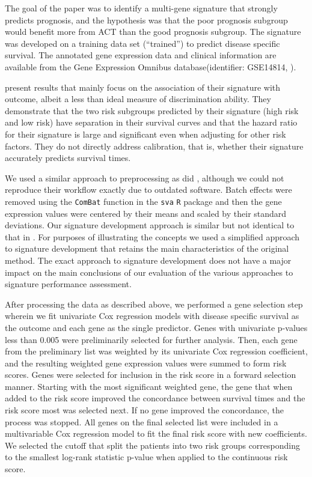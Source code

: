 \documentclass[11pt,]{article}
\begin{document}
The goal of the \citet{zhu2010prognostic} paper was to identify a
multi-gene signature that strongly predicts prognosis, and the
hypothesis was that the poor prognosis subgroup would benefit more from
ACT than the good prognosis subgroup. The signature was developed on a
training data set (``trained'') to predict disease specific survival.
The annotated gene expression data and clinical information are
available from the Gene Expression Omnibus database(identifier:
GSE14814, \citet{edgar2002gene}).

\citet{zhu2010prognostic} present results that mainly focus on the
association of their signature with outcome, albeit a less than ideal
measure of discrimination ability. They demonstrate that the two risk
subgroups predicted by their signature (high risk and low risk) have
separation in their survival curves and that the hazard ratio for their
signature is large and significant even when adjusting for other risk
factors. They do not directly address calibration, that is, whether
their signature accurately predicts survival times.

We used a similar approach to preprocessing as did
\citet{zhu2010prognostic}, although we could not reproduce their
workflow exactly due to outdated software. Batch effects were removed
using the \texttt{ComBat} function in the \texttt{sva} \texttt{R}
package \citep{leeksva} and then the gene expression values were
centered by their means and scaled by their standard deviations. Our
signature development approach is similar but not identical to that in
\citet{zhu2010prognostic}. For purposes of illustrating the concepts we
used a simplified approach to signature development that retains the
main characteristics of the original method. The exact approach to
signature development does not have a major impact on the main
conclusions of our evaluation of the various approaches to signature
performance assessment.

After processing the data as described above, we performed a gene
selection step wherein we fit univariate Cox regression models with
disease specific survival as the outcome and each gene as the single
predictor. Genes with univariate p-values less than 0.005 were
preliminarily selected for further analysis. Then, each gene from the
preliminary list was weighted by its univariate Cox regression
coefficient, and the resulting weighted gene expression values were
summed to form risk scores. Genes were selected for inclusion in the
risk score in a forward selection manner. Starting with the most
significant weighted gene, the gene that when added to the risk score
improved the concordance between survival times and the risk score most
was selected next. If no gene improved the concordance, the process was
stopped. All genes on the final selected list were included in a
multivariable Cox regression model to fit the final risk score with new
coefficients. We selected the cutoff that split the patients into two
risk groups corresponding to the smallest log-rank statistic p-value
when applied to the continuous risk score.
\end{document}
